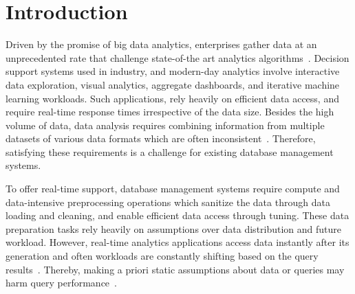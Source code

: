 \section{Introduction}
\label{sec:intro}

Driven by the promise of big data analytics, enterprises gather data 
at an unprecedented rate that challenge state-of-the art analytics 
algorithms~\cite{data_growth}.
%
Decision support systems used in industry, and modern-day analytics 
involve interactive data exploration, visual analytics, 
aggregate dashboards, and iterative machine learning workloads. Such applications, 
rely heavily on efficient data access, and require 
real-time response times irrespective of the data size. 
%
Besides the high volume of data, data analysis requires
combining information from multiple datasets of various data formats which are 
often inconsistent~\cite{data_quality,Karpathiotakis2016}.
Therefore, satisfying these requirements is a challenge
for existing database management systems.

To offer real-time support, database management systems require 
compute and data-intensive preprocessing operations which sanitize the 
data through data loading and cleaning, and enable efficient data 
access through tuning. 
These data preparation tasks rely heavily on assumptions over 
data distribution and future workload. 
However, real-time analytics applications access data instantly after 
its generation and often workloads are constantly shifting based on 
the query results~\cite{Chen2012a}. Thereby, making a priori 
static assumptions about data or queries may harm query 
performance~\cite{Agrawal2004,Chaudhuri1997}.

